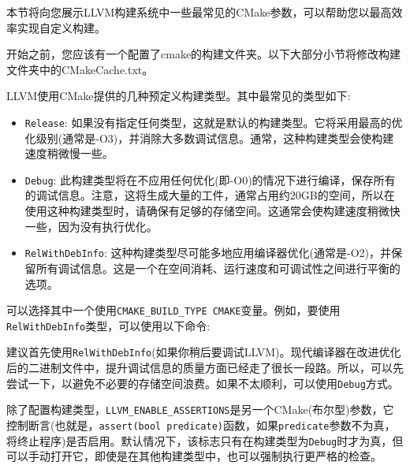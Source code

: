 本节将向您展示LLVM构建系统中一些最常见的CMake参数，可以帮助您以最高效率实现自定义构建。

开始之前，您应该有一个配置了cmake的构建文件夹。以下大部分小节将修改构建文件夹中的CMakeCache.txt。


LLVM使用CMake提供的几种预定义构建类型。其中最常见的类型如下:

\begin{itemize}
\item \texttt{Release}: 如果没有指定任何类型，这就是默认的构建类型。它将采用最高的优化级别(通常是-O3)，并消除大多数调试信息。通常，这种构建类型会使构建速度稍微慢一些。
	
\item \texttt{Debug}: 此构建类型将在不应用任何优化(即-O0)的情况下进行编译，保存所有的调试信息。注意，这将生成大量的工件，通常占用约20GB的空间，所以在使用这种构建类型时，请确保有足够的存储空间。这通常会使构建速度稍微快一些，因为没有执行优化。
	
\item \texttt{RelWithDebInfo}: 这种构建类型尽可能多地应用编译器优化(通常是-O2)，并保留所有调试信息。这是一个在空间消耗、运行速度和可调试性之间进行平衡的选项。

\end{itemize}

可以选择其中一个使用\texttt{CMAKE\_BUILD\_TYPE CMAKE}变量。例如，要使用\texttt{RelWithDebInfo}类型，可以使用以下命令:


建议首先使用\texttt{RelWithDebInfo}(如果你稍后要调试LLVM)。现代编译器在改进优化后的二进制文件中，提升调试信息的质量方面已经走了很长一段路。所以，可以先尝试一下，以避免不必要的存储空间浪费。如果不太顺利，可以使用\texttt{Debug}方式。

除了配置构建类型，\texttt{LLVM\_ENABLE\_ASSERTIONS}是另一个CMake(布尔型)参数，它控制断言(也就是，\texttt{assert(bool predicate)}函数，如果\texttt{predicate}参数不为真，将终止程序)是否启用。默认情况下，该标志只有在构建类型为\texttt{Debug}时才为真，但可以手动打开它，即使是在其他构建类型中，也可以强制执行更严格的检查。



